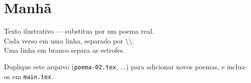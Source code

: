 \chapter{Manhã}

\begin{poema}
Texto ilustrativo --- substitua por um poema real.\\
Cada verso em uma linha, separado por \textbackslash\textbackslash.\\[6pt]
Uma linha em branco separa as estrofes.
\end{poema}

Duplique este arquivo (\texttt{poema-02.tex}, ...) para adicionar novos
poemas, e inclua-os em \texttt{main.tex}.
